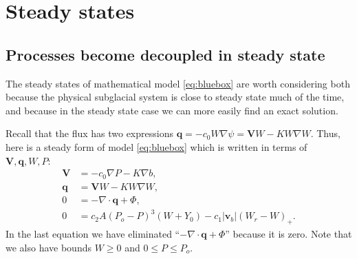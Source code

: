 \documentclass[11pt,final]{amsart}%
\newcommand\bv{\mathbf{v}}
\newcommand\bV{\mathbf{V}}
\newcommand\bq{\mathbf{q}}
\newcommand{\Div}{\nabla\cdot}
\newcommand{\grad}{\nabla}
\begin{document}
\section{Steady states}  \label{sec:steadyverif}

\subsection*{Processes become decoupled in steady state}  The steady states of mathematical model \eqref{eq:bluebox} are worth considering both because the physical subglacial system is close to steady state much of the time, and because in the steady state case we can more easily find an exact solution.

Recall that the flux has two expressions $\bq = - c_0 W \grad \psi = \bV W - K W \grad W$.  Thus, here is a steady form of model \eqref{eq:bluebox} which is written in terms of $\bV,\bq,W,P$:
\begin{align}
\bV &= - c_0 \grad P - K \grad b, \label{eq:Vsteady} \\
\bq &= \bV W - K W \grad W, \label{eq:qsteady} \\
0 &= - \Div \bq + \Phi, \label{eq:masscontsteady} \\
0 &= c_2 A (P_o - P)^3 (W+Y_0) - c_1 |\bv_b| (W_r - W)_+. \label{eq:openclosesteady}
\end{align}
In the last equation we have eliminated ``$- \Div \bq + \Phi$'' because it is zero.  Note that we also have bounds $W\ge 0$ and $0 \le P \le P_o$.
\end{document}
